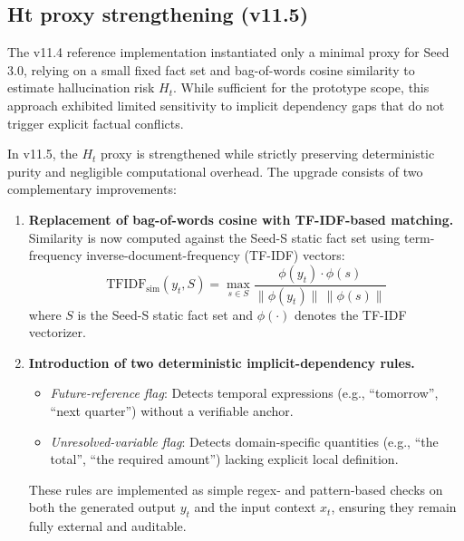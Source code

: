 \documentclass[11pt,a4paper]{article}
\begin{document}
\subsection{Ht proxy strengthening (v11.5)}
\label{sec:ht_proxy}

The v11.4 reference implementation instantiated only a minimal proxy for Seed 3.0,
relying on a small fixed fact set and bag-of-words cosine similarity to estimate
hallucination risk \(H_t\). While sufficient for the prototype scope, this approach
exhibited limited sensitivity to implicit dependency gaps that do not trigger explicit
factual conflicts.

In v11.5, the \(H_t\) proxy is strengthened while strictly preserving deterministic
purity and negligible computational overhead. The upgrade consists of two
complementary improvements:

\begin{enumerate}
    \item \textbf{Replacement of bag-of-words cosine with TF-IDF-based matching.} \\
          Similarity is now computed against the Seed-S static fact set using
          term-frequency inverse-document-frequency (TF-IDF) vectors:
          \[
          \mathrm{TFIDF}_{\mathrm{sim}}(y_t, S) =
          \max_{s \in S} \frac{\phi(y_t) \cdot \phi(s)}{\|\phi(y_t)\| \,\|\phi(s)\|}
          \]
          where \(S\) is the Seed-S static fact set and \(\phi(\cdot)\) denotes the
          TF-IDF vectorizer.

    \item \textbf{Introduction of two deterministic implicit-dependency rules.} \\
          \begin{itemize}
              \item \emph{Future-reference flag}: Detects temporal expressions
                    (e.g., ``tomorrow'', ``next quarter'') without a verifiable anchor.
              \item \emph{Unresolved-variable flag}: Detects domain-specific quantities
                    (e.g., ``the total'', ``the required amount'') lacking explicit
                    local definition.
          \end{itemize}
          These rules are implemented as simple regex- and pattern-based checks on
          both the generated output \(y_t\) and the input context \(x_t\), ensuring
          they remain fully external and auditable.
\end{enumerate}
\end{document}
